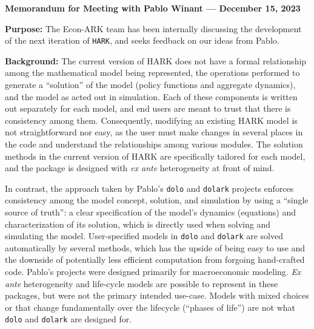 \documentclass[12pt,pdftex,letterpaper]{article}
\begin{document}
\begin{center}
	\textbf{Memorandum for Meeting with Pablo Winant --- December 15, 2023}
\end{center}

\noindent \textbf{Purpose:} The Econ-ARK team has been internally discussing the development of the next iteration of \texttt{HARK}, and seeks feedback on our ideas from Pablo.

\vspace{0.35cm}

\noindent \textbf{Background:} The current version of HARK does not have a formal relationship among the mathematical model being represented, the operations performed to generate a ``solution'' of the model (policy functions and aggregate dynamics), and the model as acted out in simulation. Each of these components is written out separately for each model, and end users are meant to trust that there is consistency among them. Consequently, modifying an existing HARK model is not straightforward nor easy, as the user must make changes in several places in the code and understand the relationships among various modules. The solution methods in the current version of HARK are specifically tailored for each model, and the package is designed with \textit{ex ante} heterogeneity at front of mind.

In contrast, the approach taken by Pablo's \texttt{dolo} and \texttt{dolark} projects enforces consistency among the model concept, solution, and simulation by using a ``single source of truth'': a clear specification of the model's dynamics (equations) and characterization of its solution, which is directly used when solving and simulating the model. User-specified models in \texttt{dolo} and \texttt{dolark} are solved automatically by several methods, which has the upside of being easy to use and the downside of potentially less efficient computation from forgoing hand-crafted code. Pablo's projects were designed primarily for macroeconomic modeling. \textit{Ex ante} heterogeneity and life-cycle models are possible to represent in these packages, but were not the primary intended use-case. Models with mixed choices or that change fundamentally over the lifecycle (``phases of life'') are not what \texttt{dolo} and \texttt{dolark} are designed for.

\vspace{0.35cm}
\end{document}
